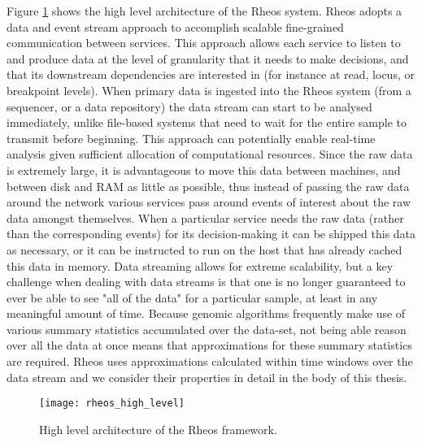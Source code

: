 Figure \ref{fig:rheos_architecture} shows the high level architecture of the Rheos system. Rheos adopts a data and event stream approach to accomplish scalable fine-grained communication between services\autocite{muthukrishnan2005data}. This approach allows each service to listen to and produce data at the level of granularity that it needs to make decisions, and that its downstream dependencies are interested in (for instance at read, locus, or breakpoint levels). When primary data is ingested into the Rheos system (from a sequencer, or a data repository) the data stream can start to be analysed immediately\autocite{han2011data}, unlike file-based systems that need to wait for the entire sample to transmit before beginning. This approach can potentially enable real-time analysis given sufficient allocation of computational resources\autocite{aggarwal2007data}. Since the raw data is extremely large, it is advantageous to move this data between machines, and between disk and RAM as little as possible, thus instead of passing the raw data around the network various services pass around events of interest about the raw data amongst themselves\autocite{etzion2011event}. When a particular service needs the raw data (rather than the corresponding events) for its decision-making it can be shipped this data as necessary, or it can be instructed to run on the host that has already cached this data in memory. Data streaming allows for extreme scalability, but a key challenge when dealing with data streams is that one is no longer guaranteed to ever be able to see "all of the data" for a particular sample, at least in any meaningful amount of time\autocite{gaber2005mining}. Because genomic algorithms frequently make use of various summary statistics accumulated over the data-set\autocite{patel2012ngs,li2013aligning}, not being able reason over all the data at once means that approximations for these summary statistics are required. Rheos uses approximations calculated within time windows over the data stream\autocite{datar2002maintaining,babcock2002models} and we consider their properties in detail in the body of this thesis.

\begin{figure}[H]
\texttt{[image: rheos\_high\_level]}
\centering
\caption {High level architecture of the Rheos framework.}
\label{fig:rheos_architecture}
\end{figure}

